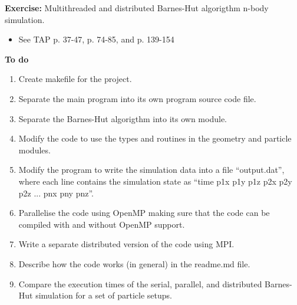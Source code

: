 
\subtitle{Course exercise 2\\ multithreaded and distributed Barnes-Hut simulation}



\begin{frame}
  \titlepage
\end{frame}


\begin{frame}
  \textbf{Exercise:} Multithreaded and distributed Barnes-Hut algorigthm n-body simulation.
  \begin{itemize}
   \item See TAP p. 37-47, p. 74-85, and p. 139-154
  \end{itemize}


  \textbf{To do}
  \begin{enumerate}
   \item Create makefile for the project.
   \item Separate the main program into its own program source code file.
   \item Separate the Barnes-Hut algorigthm into its own module.
   \item Modify the code to use the types and routines in the geometry and particle modules.
   \item Modify the program to write the simulation data into a file “output.dat”, where each line contains the simulation state as ``time p1x p1y p1z p2x p2y p2z ... pnx pny pnz''.
   \item Parallelise the code using OpenMP making sure that the code can be compiled with and without OpenMP support.
   \item Write a separate distributed version of the code using MPI.
   \item Describe how the code works (in general) in the readme.md file.
   \item Compare the execution times of the serial, parallel, and distributed Barnes-Hut simulation for a set of particle setups.
  \end{enumerate}
\end{frame}



